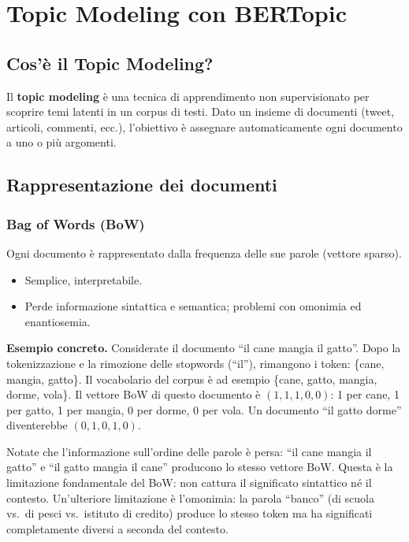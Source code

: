 \documentclass[12pt,a4paper]{article}
\begin{document}
\section{Topic Modeling con BERTopic}

\subsection{Cos'è il Topic Modeling?}

Il \textbf{topic modeling} è una tecnica di apprendimento non supervisionato per scoprire
temi latenti in un corpus di testi. Dato un insieme di documenti (tweet, articoli, commenti,
ecc.), l'obiettivo è assegnare automaticamente ogni documento a uno o più argomenti.

\subsection{Rappresentazione dei documenti}

\subsubsection{Bag of Words (BoW)}
Ogni documento è rappresentato dalla frequenza delle sue parole (vettore sparso).
\begin{itemize}
  \item[\checkmark] Semplice, interpretabile.
  \item[$\times$] Perde informazione sintattica e semantica; problemi con omonimia ed enantiosemia.
\end{itemize}

\noindent\textbf{Esempio concreto.}
Considerate il documento ``il cane mangia il gatto''. Dopo la tokenizzazione e la rimozione
delle stopwords (``il''), rimangono i token: \{cane, mangia, gatto\}. Il vocabolario del
corpus è ad esempio \{cane, gatto, mangia, dorme, vola\}. Il vettore BoW di questo documento
è $(1, 1, 1, 0, 0)$: 1 per cane, 1 per gatto, 1 per mangia, 0 per dorme, 0 per vola.
Un documento ``il gatto dorme'' diventerebbe $(0, 1, 0, 1, 0)$.

Notate che l'informazione sull'ordine delle parole è persa: ``il cane mangia il gatto''
e ``il gatto mangia il cane'' producono lo stesso vettore BoW. Questa è la limitazione
fondamentale del BoW: non cattura il significato sintattico né il contesto. Un'ulteriore
limitazione è l'omonimia: la parola ``banco'' (di scuola vs.\ di pesci vs.\ istituto di
credito) produce lo stesso token ma ha significati completamente diversi a seconda del
contesto.
\end{document}
